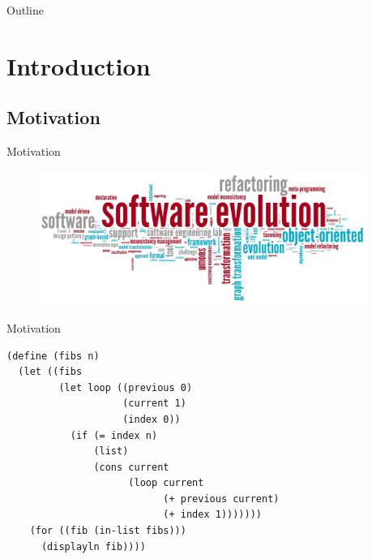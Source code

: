 \documentclass[xcolor=dvipsnames, 14pt]{beamer}
\begin{document}
\begin{frame}{Outline}
  \tableofcontents[] %
\end{frame}

\section{Introduction}
\subsection{Motivation}

\begin{frame}{Motivation}
\begin{figure}[htbp]
  \centering
  \includegraphics[width=0.95\textwidth]{img/softwareEvolution.png}
  \label{fig:SE}
\end{figure}
\end{frame}
\begin{frame}[fragile]{Motivation}
\begin{Verbatim}[fontsize=\footnotesize]
(define (fibs n)
  (let ((fibs
         (let loop ((previous 0)
                    (current 1)
                    (index 0))
           (if (= index n)
               (list)
               (cons current
                     (loop current
                           (+ previous current)
                           (+ index 1)))))))
    (for ((fib (in-list fibs)))
      (displayln fib))))
\end{Verbatim}
\end{frame}
\end{document}

